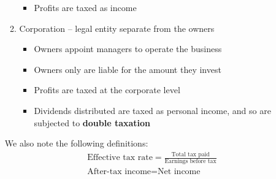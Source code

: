 \documentclass[../notes_compiled.tex]{subfiles}
\begin{document}
\begin{itemize}
\begin{enumerate}
\begin{itemize}
\item Profits are taxed as income
\end{itemize}
\item Corporation -- legal entity separate from the owners
\begin{itemize}
\item Owners appoint managers to operate the business
\item Owners only are liable for the amount they invest
\item Profits are taxed at the corporate level
\item Dividends distributed are taxed as personal income, and so are subjected to \textbf{double taxation}
\end{itemize}
\end{enumerate}
We also note the following definitions:
\begin{gather}
\text{Effective tax rate} = \frac{\text{Total tax paid}}{\text{Earnings before tax}} \\
\text{After-tax income} = \text{Net income}
\end{gather}
\end{itemize}
\end{document}
